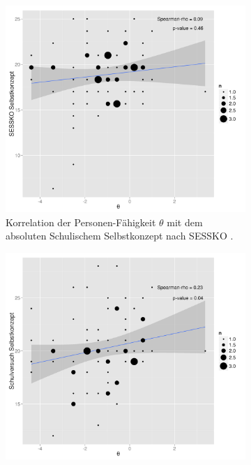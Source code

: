   \begin{figure}[htbp]
  \ContinuedFloat %
  \centering
  \begin{subfigure}{0.49\textwidth}
   \includegraphics[width=1.0\linewidth]{graphics/corPersonenSESSKO.png}
   \caption{Korrelation der Personen-Fähigkeit $\theta$ mit dem absoluten Schulischem Selbstkonzept nach SESSKO \citep{Schone2002}.}
   \label{fig:corPersonenSESSKO}
  \end{subfigure}
  \begin{subfigure}{0.49\textwidth}
    \includegraphics[width=1.0\linewidth]{graphics/corPersonenSelbskonzept.png}

\end{subfigure}
\end{figure}
